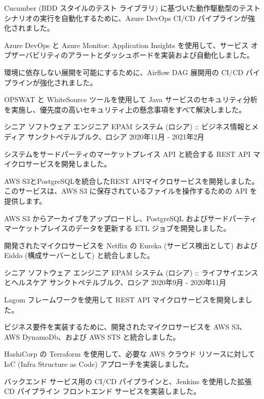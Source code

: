 \begin{cventries}
{\begin{cvitems}
    \item {Cucumber (BDD スタイルのテスト ライブラリ) に基づいた動作駆動型のテスト シナリオの実行を自動化するために、Azure DevOps CI/CD パイプラインが強化されました。}
    \item {Azure DevOps と Azure Monitor: Application Insights を使用して、サービス オブザーバビリティのアラートとダッシュボードを実装および自動化しました。}
    \item {環境に依存しない展開を可能にするために、Airflow DAG 展開用の CI/CD パイプラインが強化されました。}
    \item {OPSWAT と WhiteSource ツールを使用して Java サービスのセキュリティ分析を実施し、優先度の高いセキュリティ上の懸念事項をすべて解決しました。}
  \end{cvitems}
}
\cventry
{シニア ソフトウェア エンジニア} %
{EPAM システム (ロシア) ::  ビジネス情報とメディア} %
{サンクトペテルブルク、ロシア} %
{2020年11月 - 2021年2月} %
{
  \begin{cvitems} %
    \item {システムをサードパーティのマーケットプレイス API と統合する REST API マイクロサービスを開発しました。}
    \item {AWS S3とPostgreSQLを統合したREST APIマイクロサービスを開発しました。 このサービスは、AWS S3 に保存されているファイルを操作するための API を提供します。}
    \item {AWS S3 からアーカイブをアップロードし、PostgreSQL およびサードパーティ マーケットプレイスのデータを更新する ETL ジョブを開発しました。}
    \item {開発されたマイクロサービスを Netflix の Eureka (サービス検出として) および Eiddo (構成サーバーとして) と統合しました。}
  \end{cvitems}
}

\cventry
{シニア ソフトウェア エンジニア} %
{EPAM システム (ロシア) :: ライフサイエンスとヘルスケア} %
{サンクトペテルブルク、ロシア} %
{2020年9月 - 2020年11月} %
{
  \begin{cvitems} %
    \item {Lagom フレームワークを使用して REST API マイクロサービスを開発しました。}
    \item {ビジネス要件を実装するために、開発されたマイクロサービスを AWS S3、AWS DynamoDb、および AWS STS と統合しました。}
    \item {HashiCorp の Terraform を使用して、必要な AWS クラウド リソースに対して IaC (Infra Structure as Code) アプローチを実装しました。}
    \item {バックエンド サービス用の CI/CD パイプラインと、Jenkins を使用した拡張 CD パイプライン フロントエンド サービスを実装しました。}
  \end{cvitems}
}


\end{cventries}

